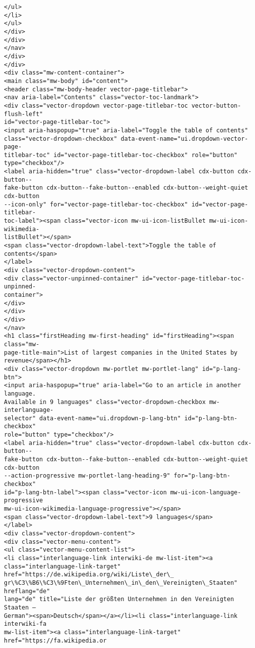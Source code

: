 \documentclass[11pt]{article}
\begin{document}
\begin{Verbatim}[commandchars=\\\{\}]
</ul>
</li>
</ul>
</div>
</div>
</nav>
</div>
</div>
<div class="mw-content-container">
<main class="mw-body" id="content">
<header class="mw-body-header vector-page-titlebar">
<nav aria-label="Contents" class="vector-toc-landmark">
<div class="vector-dropdown vector-page-titlebar-toc vector-button-flush-left"
id="vector-page-titlebar-toc">
<input aria-haspopup="true" aria-label="Toggle the table of contents"
class="vector-dropdown-checkbox" data-event-name="ui.dropdown-vector-page-
titlebar-toc" id="vector-page-titlebar-toc-checkbox" role="button"
type="checkbox"/>
<label aria-hidden="true" class="vector-dropdown-label cdx-button cdx-button--
fake-button cdx-button--fake-button--enabled cdx-button--weight-quiet cdx-button
--icon-only" for="vector-page-titlebar-toc-checkbox" id="vector-page-titlebar-
toc-label"><span class="vector-icon mw-ui-icon-listBullet mw-ui-icon-wikimedia-
listBullet"></span>
<span class="vector-dropdown-label-text">Toggle the table of contents</span>
</label>
<div class="vector-dropdown-content">
<div class="vector-unpinned-container" id="vector-page-titlebar-toc-unpinned-
container">
</div>
</div>
</div>
</nav>
<h1 class="firstHeading mw-first-heading" id="firstHeading"><span class="mw-
page-title-main">List of largest companies in the United States by
revenue</span></h1>
<div class="vector-dropdown mw-portlet mw-portlet-lang" id="p-lang-btn">
<input aria-haspopup="true" aria-label="Go to an article in another language.
Available in 9 languages" class="vector-dropdown-checkbox mw-interlanguage-
selector" data-event-name="ui.dropdown-p-lang-btn" id="p-lang-btn-checkbox"
role="button" type="checkbox"/>
<label aria-hidden="true" class="vector-dropdown-label cdx-button cdx-button--
fake-button cdx-button--fake-button--enabled cdx-button--weight-quiet cdx-button
--action-progressive mw-portlet-lang-heading-9" for="p-lang-btn-checkbox"
id="p-lang-btn-label"><span class="vector-icon mw-ui-icon-language-progressive
mw-ui-icon-wikimedia-language-progressive"></span>
<span class="vector-dropdown-label-text">9 languages</span>
</label>
<div class="vector-dropdown-content">
<div class="vector-menu-content">
<ul class="vector-menu-content-list">
<li class="interlanguage-link interwiki-de mw-list-item"><a
class="interlanguage-link-target" href="https://de.wikipedia.org/wiki/Liste\_der\_
gr\%C3\%B6\%C3\%9Ften\_Unternehmen\_in\_den\_Vereinigten\_Staaten" hreflang="de"
lang="de" title="Liste der größten Unternehmen in den Vereinigten Staaten –
German"><span>Deutsch</span></a></li><li class="interlanguage-link interwiki-fa
mw-list-item"><a class="interlanguage-link-target" href="https://fa.wikipedia.or

\end{Verbatim}
\end{document}
